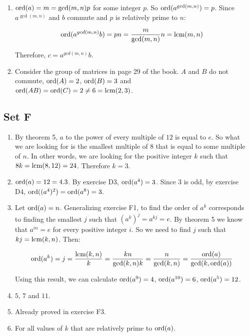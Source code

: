 \begin{enumerate}
    \item $ \operatorname{ord}(a) = m = \gcd(m, n)p $ for some integer $ p $. So $ \operatorname{ord}(a^{\gcd(m, n)}) = p $. Since $ a^{\gcd(m, n)} $ and $ b $ commute and $ p $ is relatively prime to $ n $:

    $$ \operatorname{ord}(a^{gcd(m, n)}b) = pn = \frac{m}{\gcd(m, n)}n = \operatorname{lcm}(m, n) $$

    Therefore, $ c = a^{gcd(m, n)}b $.

    \item Consider the group of matrices in page 29 of the book. $ A $ and $ B $ do not commute, $ \operatorname{ord}(A) = 2 $, $ \operatorname{ord}(B) = 3 $ and $ \operatorname{ord}(AB) = \operatorname{ord}(C) = 2 \ne 6 = \operatorname{lcm}(2, 3) $.
\end{enumerate}

\subsection{Set F}
\begin{enumerate}
    \item By theorem 5, $ a $ to the power of every multiple of $ 12 $ is equal to $ e $. So what we are looking for is the smallest multiple of $ 8 $ that is equal to some multiple of $ n $. In other words, we are looking for the positive integer $ k $ such that $ 8k = \operatorname{lcm}(8, 12) = 24 $. Therefore $ k = 3 $.

    \item $ \operatorname{ord}(a) = 12 = 4.3 $. By exercise D3, $ \operatorname{ord}(a^4) = 3 $. Since $ 3 $ is odd, by exercise D4, $ \operatorname{ord}((a^4)^2) = \operatorname{ord}(a^8) = 3 $.

    \item Let $ \operatorname{ord}(a) = n $. Generalizing exercise F1, to find the order of $ a^k $ corresponds to finding the smallest $ j $ such that $ (a^k)^j = a^{kj} = e $. By theorem 5 we know that $ a^{in} = e$ for every positive integer $ i $. So we need to find $ j $ such that $ kj = \operatorname{lcm}(k, n) $. Then:

    $$ \operatorname{ord}(a^k) = j = \frac{\operatorname{lcm}(k, n)}{k} = \frac{kn}{\gcd(k, n)k} = \frac{n}{\gcd(k, n)} = \frac{\operatorname{ord}(a)}{\gcd(k, \operatorname{ord}(a))} $$

    Using this result, we can calculate $ \operatorname{ord}(a^9) = 4 $, $ \operatorname{ord}(a^{10}) = 6 $, $ \operatorname{ord}(a^5) = 12 $.

    \item $5$, $7$ and $11$.

    \item Already proved in exercise F3.

    \item For all values of $ k $ that are relatively prime to $ \operatorname{ord}(a) $.
\end{enumerate}

